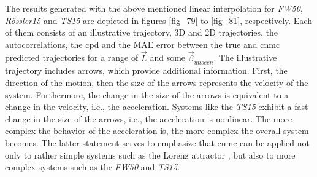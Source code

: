 \FloatBarrier
The results generated with the above mentioned linear interpolation for  \emph{FW50}, \emph{Rössler15} and \emph{TS15} are depicted in figures \ref{fig_79} to \ref{fig_81}, respectively. 
Each of them consists of an illustrative trajectory, 3D and 2D trajectories, the autocorrelations, the \gls{cpd} and the MAE error between the true and \gls{cnmc} predicted trajectories for a range of $\vec{L}$ and some $\vec{\beta}_{unseen}$.
The illustrative trajectory includes arrows, which provide additional information.
First, the direction of the motion, then the size of the arrows represents the velocity of the system. Furthermore, the change in the size of the arrows is equivalent to a change in the velocity, i.e., the acceleration.
Systems like the \emph{TS15} exhibit a fast change in the size of the arrows, i.e., the acceleration is nonlinear. 
The more complex the behavior of the acceleration is, the more complex the overall system becomes.
The latter statement serves to emphasize that \gls{cnmc} can be applied not only to rather simple systems such as the Lorenz attractor \cite{lorenz1963deterministic}, but also to more complex systems such as the \emph{FW50} and \emph{TS15}.\newline 


